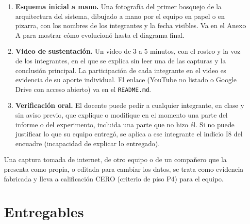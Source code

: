\documentclass[11pt,a4paper]{article}
\begin{document}
\begin{enumerate}[label=\textbf{E\arabic*.},leftmargin=2.2em]
	\item \textbf{Esquema inicial a mano.} Una fotografía del primer bosquejo de la arquitectura del sistema, dibujado a mano por el equipo en papel o en pizarra, con los nombres de los integrantes y la fecha visibles. Va en el Anexo A para mostrar cómo evolucionó hasta el diagrama final.
	\item \textbf{Video de sustentación.} Un video de 3 a 5 minutos, con el rostro y la voz de los integrantes, en el que se explica sin leer una de las capturas y la conclusión principal. La participación de cada integrante en el video es evidencia de su aporte individual. El enlace (YouTube no listado o Google Drive con acceso abierto) va en el \texttt{README.md}.
	\item \textbf{Verificación oral.} El docente puede pedir a cualquier integrante, en clase y sin aviso previo, que explique o modifique en el momento una parte del informe o del experimento, incluida una parte que no hizo él. Si no puede justificar lo que su equipo entregó, se aplica a ese integrante el indicio I8 del encuadre (incapacidad de explicar lo entregado).
\end{enumerate}

\begin{avisoBox}[title={Capturas originales}]
	Una captura tomada de internet, de otro equipo o de un compañero que la presenta como propia, o editada para cambiar los datos, se trata como evidencia fabricada y lleva a calificación CERO (criterio de piso P4) para el equipo.
\end{avisoBox}

\section{Entregables}\label{sec:entregables}
\end{document}
